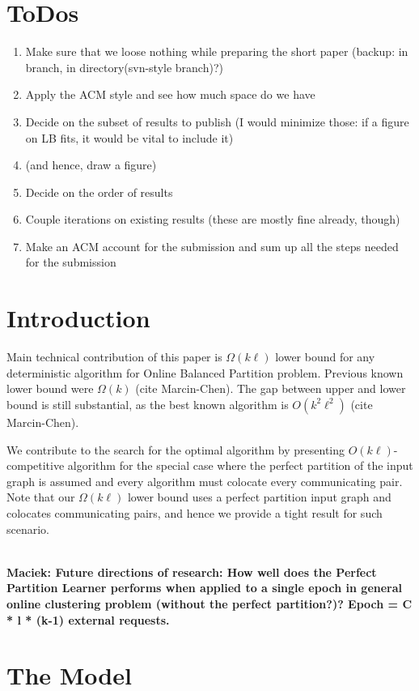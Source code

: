 \documentclass[conference]{IEEEtran}
\newcommand\maciek[1]{\color{brown}\textbf{\\ Maciek: #1}\color{black}}
\begin{document}
\section{ToDos}

\begin{enumerate}
    \item Make sure that we loose nothing while preparing the short paper (backup: in branch, in directory(svn-style branch)?)
    \item Apply the ACM style and see how much space do we have
    \item Decide on the subset of results to publish (I would minimize those: if a figure on LB fits, it would be vital to include it)
    \item (and hence, draw a figure)
    \item Decide on the order of results
    \item Couple iterations on existing results (these are mostly fine already, though)
    \item Make an ACM account for the submission and sum up all the steps needed for the submission
\end{enumerate}

\section{Introduction}

Main technical contribution of this paper is $\Omega(k\ell)$ lower bound for any deterministic algorithm for Online Balanced Partition problem.
Previous known lower bound were $\Omega(k)$ (cite Marcin-Chen).
The gap between upper and lower bound is still substantial, as the best known algorithm is $O(k^2\ell^2)$ (cite Marcin-Chen).

We contribute to the search for the optimal algorithm by presenting $O(k\ell)$-competitive algorithm for the special case where the perfect partition of the input graph is assumed and every algorithm must colocate every communicating pair.
Note that our $\Omega(k\ell)$ lower bound uses a perfect partition input graph and colocates communicating pairs, and hence we provide a tight result for such scenario.

\maciek{Future directions of research: How well does the Perfect Partition Learner performs when applied to a single epoch in general online clustering problem (without the perfect partition?)? Epoch = C * l * (k-1) external requests.}

\section{The Model}
\end{document}
